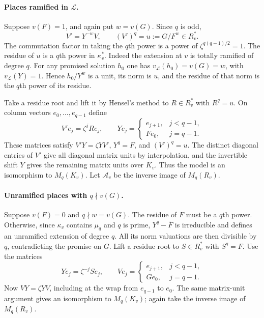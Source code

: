 \paragraph{Places ramified in $\mathcal L$.}
Suppose $v(F)=1$, and again put $w=v(G)$.  Since $q$ is odd,
\begin{equation}\label{norm:ramified-unit}
 V'=Y^{-w}V,\qquad (V')^q=u:=G/F^w\in R_v^*.
\end{equation}
The commutation factor in taking the $q$th power is a power of
$\zeta^{q(q-1)/2}=1$.  The residue of $u$ is a $q$th power in
$\kappa_v^*$.  Indeed the extension at $v$ is totally ramified of
degree $q$.  For any promised solution $h_0$ one has
$v_{\mathcal L}(h_0)=v(G)=w$, with $v_{\mathcal L}(Y)=1$.  Hence $h_0/Y^w$ is a unit, its
norm is $u$, and the residue of that norm is the $q$th power of its
residue.

Take a residue root and lift it by Hensel's method to $R\in R_v^*$
with $R^q=u$.  On column vectors $e_0,\ldots,e_{q-1}$ define
\begin{equation}\label{norm:ramified-matrices}
 V'e_j=\zeta^jR e_j,\qquad
 Ye_j=\begin{cases}e_{j+1},&j<q-1,\\F e_0,&j=q-1.\end{cases}
\end{equation}
These matrices satisfy $V'Y=\zeta YV'$, $Y^q=F$, and $(V')^q=u$.
The distinct diagonal entries of $V'$ give all diagonal matrix units
by interpolation, and the invertible shift $Y$ gives the remaining
matrix units over $K_v$.  Thus the model is an isomorphism to
$M_q(K_v)$.  Let $\mathcal A_v$ be the inverse image of $M_q(R_v)$.

\paragraph{Unramified places with $q\nmid v(G)$.}
Suppose $v(F)=0$ and $q\nmid w=v(G)$.  The residue of $F$ must be a
$q$th power.  Otherwise, since $\kappa_v$ contains $\mu_q$ and $q$ is
prime, $Y^q-\overline F$ is irreducible and defines an unramified
extension of degree $q$.  All its norm valuations are then divisible
by $q$, contradicting the promise on $G$.  Lift a residue root to
$S\in R_v^*$ with $S^q=F$.  Use the matrices
\begin{equation}\label{norm:unramified-matrices}
 Ye_j=\zeta^{-j}S e_j,\qquad
 Ve_j=\begin{cases}e_{j+1},&j<q-1,\\G e_0,&j=q-1.\end{cases}
\end{equation}
Now $VY=\zeta YV$, including at the wrap from $e_{q-1}$ to $e_0$.
The same matrix-unit argument gives an isomorphism to $M_q(K_v)$;
again take the inverse image of $M_q(R_v)$.

